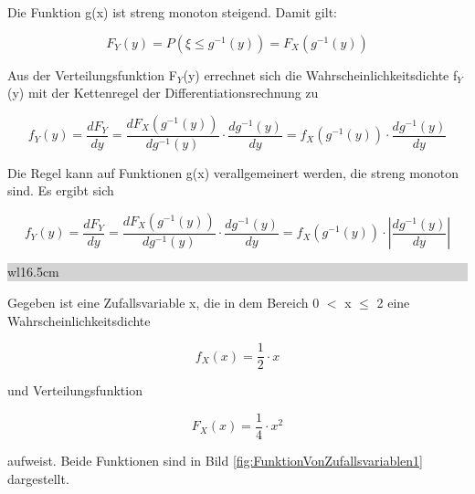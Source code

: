 \clearpage

\noindent Die Funktion g(x) ist streng monoton steigend. Damit gilt:

\begin{equation}\label{eq:foureightyfour}
F_{Y} (y)=P\left(\xi \le g^{-1} (y)\right)=F_{X} (g^{-1}(y))
\end{equation}

\noindent Aus der Verteilungsfunktion F$_{Y}$(y) errechnet sich die Wahrscheinlichkeitsdichte f$_{Y}$(y) mit der Kettenregel der Differentiationsrechnung zu

\begin{equation}\label{eq:foureightyfive}
f_{Y} (y)=\dfrac{dF_{Y}}{dy} =\dfrac{dF_{X} (g^{-1} (y))}{dg^{-1} (y)} \cdot \dfrac{dg^{-1} (y)}{dy} =f_{X} (g^{-1} (y))\cdot \dfrac{dg^{-1} (y)}{dy}
\end{equation}

\noindent Die Regel kann auf Funktionen g(x) verallgemeinert werden, die streng monoton sind. Es ergibt sich

\begin{equation}\label{eq:foureightysix}
f_{Y} (y)=\dfrac{dF_{Y} }{dy} =\dfrac{dF_{X} \left(g^{-1} (y)\right)}{dg^{-1} (y)} \cdot \dfrac{dg^{-1} \left(y\right)}{dy} =f_{X} (g^{-1} (y))\cdot \left|\dfrac{dg^{-1} (y)}{dy} \right|
\end{equation}

\noindent
\colorbox{lightgray}{%
%
\renewcommand\arraystretch{0.6}%
\begin{tabular}{ wl{16.5cm} }
{\selectfont{Beispiel: Abbildung einer kontinuierlichen Zufallsvariable}}
\end{tabular}%
}\medskip 

\noindent Gegeben ist eine Zufallsvariable x, die in dem Bereich 0 $\mathrm{<}$ x $\leq$ 2 eine Wahrscheinlichkeitsdichte 

\begin{equation}\label{eq:foureightyseven}
f_{X} (x)=\dfrac{1}{2} \cdot x
\end{equation}

\noindent und Verteilungsfunktion

\begin{equation}\label{eq:foureightyeight}
F_{X} \left(x\right)=\dfrac{1}{4} \cdot x^{2}
\end{equation}

\noindent aufweist. Beide Funktionen sind in Bild \ref{fig:FunktionVonZufallsvariablen1} dargestellt.

